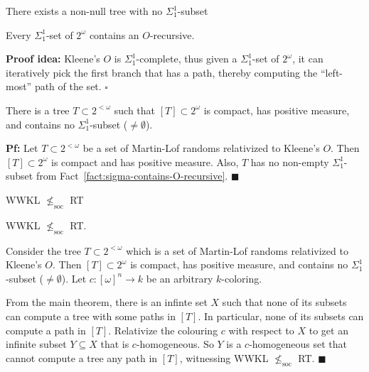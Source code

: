 \begin{frame}{There exists a non-null tree with no $\Sigma_1^1$-subset}
  \begin{fact}
    \label{fact:sigma-contains-O-recursive}
    Every $\Sigma_1^1$-set of $2^\omega$ contains an $O$-recursive.
  \end{fact}
  \textbf{Proof idea:} Kleene's $O$ is $\Sigma_1^1$-complete, thus given a 
  $\Sigma_1^1$-set of $2^\omega$, it can iteratively pick the first branch
  that has a path, thereby computing the ``left-most'' path of the set.
  $\square$

  \vspace{1em}
  \begin{thm}
    There is a tree $T\subset2^{<\omega}$ such that $[T]\subset
    2^\omega$ is compact, has positive measure, and contains no
    $\Sigma_1^1$-subset ($\neq\emptyset$).
  \end{thm}
  \textbf{Pf:} Let $T\subset2^{<\omega}$ be a set of Martin-Lof randoms
  relativized to Kleene's $O$. Then $[T]\subset 2^\omega$ is compact and
  has positive measure. Also, $T$ has no non-empty $\Sigma_1^1$-subset from
  Fact~\ref{fact:sigma-contains-O-recursive}. $\blacksquare$
\end{frame}

\begin{frame}{WWKL $\nleq_{\text{soc}}$ RT}
  \begin{theorem}
    WWKL $\nleq_{\text{soc}}$ RT.
  \end{theorem}

  Consider the tree $T\subset2^{<\omega}$ which is a set of Martin-Lof
  randoms relativized to Kleene's $O$. Then $[T]\subset 2^\omega$ is
  compact, has positive measure, and contains no $\Sigma_1^1$-subset
  ($\neq\emptyset$). Let $c:[\omega]^n\rightarrow k$ be an arbitrary
  $k$-coloring.
  
  \vspace{1em}
  From the main theorem, there is an infinte set $X$ such that none of its
  subsets can compute a tree with some paths in $[T]$. In particular, none
  of its subsets can compute a path in $[T]$. Relativize the
  colouring $c$ with respect to $X$ to get an infinite subset $Y\subseteq
  X$ that is $c$-homogeneous. So $Y$ is a $c$-homogeneous set that cannot
  compute a tree any path in $[T]$, witnessing WWKL $\nleq_{\text{soc}}$
  RT. $\blacksquare$
\end{frame}
